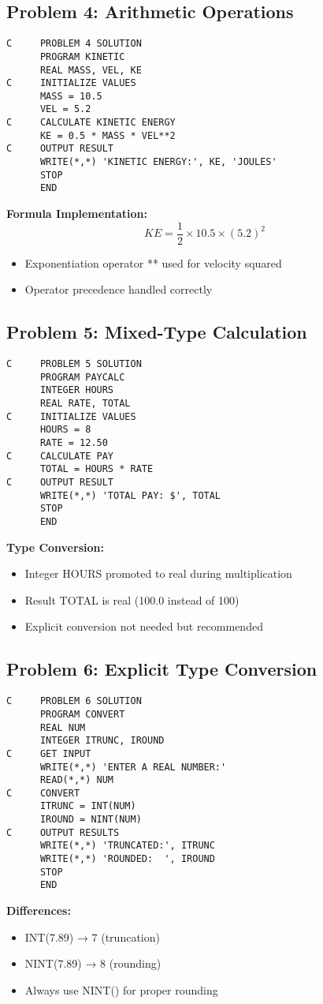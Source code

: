 \documentclass{book}
\begin{document}
\subsection*{Problem 4: Arithmetic Operations}
\begin{verbatim}
C     PROBLEM 4 SOLUTION
      PROGRAM KINETIC
      REAL MASS, VEL, KE
C     INITIALIZE VALUES
      MASS = 10.5
      VEL = 5.2
C     CALCULATE KINETIC ENERGY
      KE = 0.5 * MASS * VEL**2
C     OUTPUT RESULT
      WRITE(*,*) 'KINETIC ENERGY:', KE, 'JOULES'
      STOP
      END
\end{verbatim}
\textbf{Formula Implementation:}
\[ KE = \frac{1}{2} \times 10.5 \times (5.2)^2 \]
\begin{itemize}
    \item Exponentiation operator ** used for velocity squared
    \item Operator precedence handled correctly
\end{itemize}

\subsection*{Problem 5: Mixed-Type Calculation}
\begin{verbatim}
C     PROBLEM 5 SOLUTION
      PROGRAM PAYCALC
      INTEGER HOURS
      REAL RATE, TOTAL
C     INITIALIZE VALUES
      HOURS = 8
      RATE = 12.50
C     CALCULATE PAY
      TOTAL = HOURS * RATE
C     OUTPUT RESULT
      WRITE(*,*) 'TOTAL PAY: $', TOTAL
      STOP
      END
\end{verbatim}
\textbf{Type Conversion:}
\begin{itemize}
    \item Integer HOURS promoted to real during multiplication
    \item Result TOTAL is real (100.0 instead of 100)
    \item Explicit conversion not needed but recommended
\end{itemize}

\subsection*{Problem 6: Explicit Type Conversion}
\begin{verbatim}
C     PROBLEM 6 SOLUTION
      PROGRAM CONVERT
      REAL NUM
      INTEGER ITRUNC, IROUND
C     GET INPUT
      WRITE(*,*) 'ENTER A REAL NUMBER:'
      READ(*,*) NUM
C     CONVERT
      ITRUNC = INT(NUM)
      IROUND = NINT(NUM)
C     OUTPUT RESULTS
      WRITE(*,*) 'TRUNCATED:', ITRUNC
      WRITE(*,*) 'ROUNDED:  ', IROUND
      STOP
      END
\end{verbatim}
\textbf{Differences:}
\begin{itemize}
    \item INT(7.89) → 7 (truncation)
    \item NINT(7.89) → 8 (rounding)
    \item Always use NINT() for proper rounding
\end{itemize}
\end{document}
